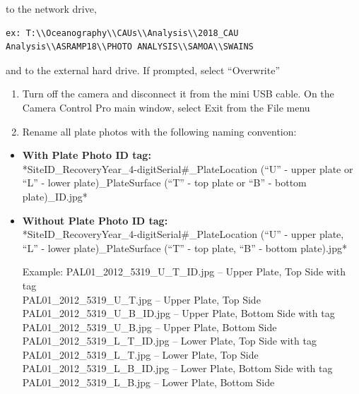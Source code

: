 \documentclass[]{book}
\begin{document}
to the network drive,

\begin{verbatim}
ex: T:\\Oceanography\\CAUs\\Analysis\\2018_CAU Analysis\\ASRAMP18\\PHOTO ANALYSIS\\SAMOA\\SWAINS   
\end{verbatim}

and to the external hard drive. If prompted, select ``Overwrite''

\begin{enumerate}
\def\labelenumi{\arabic{enumi}.}
\setcounter{enumi}{18}
\item
  Turn off the camera and disconnect it from the mini USB cable. On the Camera Control Pro main window, select Exit from the File menu
\item
  Rename all plate photos with the following naming convention:
\end{enumerate}

\begin{itemize}
\item
  \textbf{With Plate Photo ID tag:}\\
  *SiteID\_RecoveryYear\_4-digitSerial\#\_PlateLocation (``U'' - upper plate or ``L'' - lower plate)\_PlateSurface (``T'' - top plate or ``B'' - bottom plate)\_ID.jpg*
\item
  \textbf{Without Plate Photo ID tag:}\\
  *SiteID\_RecoveryYear\_4-digitSerial\#\_PlateLocation (``U'' - upper plate, ``L'' - lower plate)\_PlateSurface (``T'' - top plate, ``B'' - bottom plate).jpg*

  Example:
  PAL01\_2012\_5319\_U\_T\_ID.jpg -- Upper Plate, Top Side with tag\\
  PAL01\_2012\_5319\_U\_T.jpg -- Upper Plate, Top Side\\
  PAL01\_2012\_5319\_U\_B\_ID.jpg -- Upper Plate, Bottom Side with tag
  PAL01\_2012\_5319\_U\_B.jpg -- Upper Plate, Bottom Side\\
  PAL01\_2012\_5319\_L\_T\_ID.jpg -- Lower Plate, Top Side with tag\\
  PAL01\_2012\_5319\_L\_T.jpg -- Lower Plate, Top Side\\
  PAL01\_2012\_5319\_L\_B\_ID.jpg -- Lower Plate, Bottom Side with tag\\
  PAL01\_2012\_5319\_L\_B.jpg -- Lower Plate, Bottom Side
\end{itemize}
\end{document}
